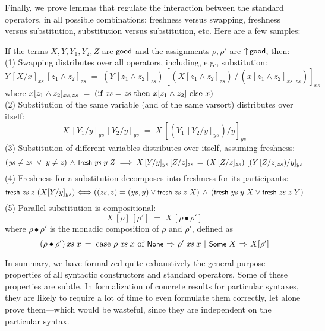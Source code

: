 \documentclass{llncs}
\begin{document}
Finally, we %
prove lemmas that regulate the interaction between the standard operators, in all possible combinations: 
freshness versus swapping, freshness versus substitution, substitution versus substitution, etc. 
Here are a few samples: 
%

\begin{prop}\label{lem-long}\rm
If the terms $X,Y,Y_1,Y_2,Z$ are $\mbox{\rm\textsf{\small good}}$ and the assignments $\rho,\rho'$ are $\mbox{$\uparrow$}\,\mbox{\rm\textsf{\small good}}$,   
%
then: 
\\(1) Swapping distributes over all operators, including, e.g., substitution:
%
$$Y\,[X/x]_{xs}\,[z_1 \wedge z_2]_{zs} \;=\; (Y\,[z_1 \wedge z_2]_{zs})\,[(X[z_1 \wedge z_2]_{zs})\,/\,(x[z_1 \wedge z_2]_{xs,zs}) ]_{xs}$$
%
where $x[z_1 \wedge z_2]_{xs,zs} \;=\; (\mbox{if $\mbox{\textit{xs}} = \mbox{\textit{zs}}$ then $x[z_1 \wedge z_2]$ else $x$})$
%
\\(2) Substitution of the same variable (and of the same varsort) distributes over itself: 
%
$$
X\ [Y_1 / y]_{ys}\, [Y_2 / y]_{ys} \;=\; X\,[(Y_1\,[Y_2 / y]_{ys}) / y]_{ys}
$$
%
\noindent
(3) Substitution of different variables distributes over itself, assuming %
freshness: %
%
$$(\mbox{\textit{ys}} \neq \mbox{\textit{zs}}\ \lor\ y \neq z) \,\wedge\, \mbox{\rm\textsf{\small fresh}}\;\mbox{\textit{ys}}\;y\;Z
\;\Longrightarrow\; 
X\,[Y / y]_{ys}\, [Z / z]_{zs} \,=\, (X\,[Z / z]_{zs})\ [(Y\,[Z / z]_{zs}) / y]_{ys}
$$
%
\noindent
(4) Freshness for a substitution decomposes into freshness for its participants: 
%
$$\mbox{\rm\textsf{\small fresh}}\;\mbox{\textit{zs}}\;z\;(X[Y / y]_{ys}) 
\Longleftrightarrow
((\mbox{\textit{zs}},z)=(\mbox{\textit{ys}},y) \lor \mbox{\rm\textsf{\small fresh}}\;\mbox{\textit{zs}}\;z\;X) \,\land\,  (\mbox{\rm\textsf{\small fresh}}\;\mbox{\textit{ys}}\;y\;X \lor \mbox{\rm\textsf{\small fresh}}\;\mbox{\textit{zs}}\;z\;Y)$$
%
\noindent
{} %
(5) Parallel substitution is compositional: %
$$X\,[\rho]\,[\rho'] \;=\; X\,[\rho \bullet \rho']$$
where $\rho \bullet \rho'$ is the monadic composition of $\rho$ and $\rho'$, defined as 
%
$$
(\rho \bullet \rho')\,\mbox{\textit{xs}}\;x \,=\; \mbox{case $\rho\;\mbox{\textit{xs}}\;x$ of $\mbox{\rm\textsf{\small None}}$ $\Rightarrow$ $\rho'\;\mbox{\textit{xs}}\;x$ $\mid$ $\mbox{\rm\textsf{\small Some}}\;X$ $\Rightarrow$ $X[\rho']$}
$$
\end{prop}


In summary, we have formalized quite exhaustively the general-purpose properties of all syntactic constructors 
and standard operators. %
%
Some of these properties are %
subtle. In formalization of concrete results for particular syntaxes, 
they are likely to require a lot of time to even formulate them correctly, let alone prove them---which would be 
wasteful, 
since they are independent on the particular syntax.
\end{document}
